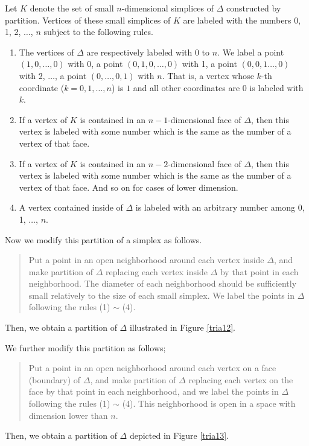 \documentclass[reqno]{amsart}
\begin{document}
Let $K$ denote the set of small $n$-dimensional simplices of $\Delta$ constructed by partition. Vertices of these small simplices of $K$ are labeled with the numbers 0, 1, 2, $\dots$, $n$ subject to the following rules.
\begin{enumerate}
\item The vertices of $\Delta$ are respectively labeled with 0 to $n$. We label a point $(1,0, \dots, 0)$ with 0, a point $(0,1,0, \dots, 0)$ with 1, a point $(0,0,1 \dots, 0)$ with 2, $\dots$, a point $(0,\dots, 0,1)$ with $n$. That is, a vertex whose $k$-th coordinate ($k=0, 1, \dots, n$) is $1$ and all other coordinates are 0 is labeled with $k$. 

\item If a vertex of $K$ is contained in an $n-1$-dimensional face of $\Delta$, then this vertex is labeled with some number which is the same as the number of a vertex of that face.

\item If a vertex of $K$ is contained in an $n-2$-dimensional face of $\Delta$, then this vertex is labeled with some number which is the same as the number of a vertex of that face. And so on for cases of lower dimension.

\item A vertex contained inside of $\Delta$ is labeled with an arbitrary number among 0, 1, $\dots$, $n$.
\end{enumerate}

Now we modify this partition of a simplex as follows.
\begin{quote}
Put a point in an open neighborhood around each vertex inside $\Delta$, and make partition of $\Delta$ replacing each vertex inside $\Delta$ by that point in each neighborhood. The diameter of each neighborhood should be sufficiently small relatively to the size of each small simplex. We label the points in $\Delta$ following the rules (1) $\sim$ (4).
\end{quote}
Then, we obtain a partition of $\Delta$ illustrated in Figure \ref{tria12}.

We further modify this partition as follows;
\begin{quote}
Put a point in an open neighborhood around each vertex on a face (boundary) of $\Delta$, and make partition of $\Delta$ replacing each vertex on the face by that point in each neighborhood, and we label the points in $\Delta$ following the rules (1) $\sim$ (4). This neighborhood is open in a space with dimension lower than $n$.
\end{quote}
Then, we obtain a partition of $\Delta$ depicted in Figure \ref{tria13}.%
\end{document}
